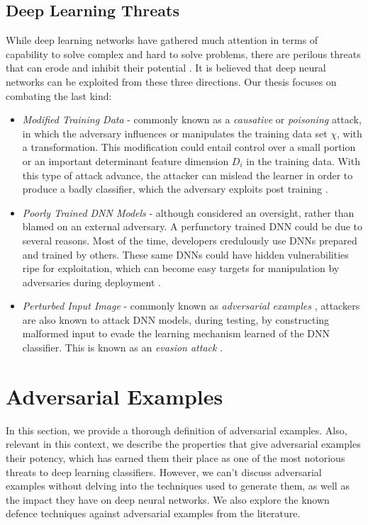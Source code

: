 \documentclass[grad,lot,lof,11pt,oneside,onehalfspace]{RUthesis}
\begin{document}
\subsection{Deep Learning Threats}
While deep learning networks have gathered much attention in terms of capability to solve complex and hard to solve problems, there are perilous threats that can erode and inhibit their potential \cite{xiao_security_2017}. It is believed that deep neural networks can be exploited from these three directions. Our thesis focuses on combating the last kind:
\begin{itemize}
	\item \textit{Modified Training Data} - commonly known as a \textit{causative} or \textit{poisoning} attack, in which the adversary influences or manipulates the training data set \textit{$\chi$}, with a transformation. This modification could entail control over a small portion or an important determinant feature dimension $D_{i}$ in the training data. With this type of attack advance, the attacker can mislead the learner in order to produce a badly classifier, which the adversary exploits post training \cite{huang_adversarial_2011}. 
	\item \textit{Poorly Trained DNN Models} - although considered an oversight, rather than blamed on an external adversary. A perfunctory trained DNN could be due to several reasons. Most of the time, developers 
	credulously use DNNs prepared and trained by others. These same DNNs could have hidden vulnerabilities ripe for exploitation, which can become easy targets for manipulation by adversaries during deployment \cite{xiao_security_2017}.   
	\item \textit{Perturbed Input Image} - commonly known as \textit{adversarial examples} \cite{kurakin_adversarial_2017}, attackers are also known to attack DNN models, during testing, by constructing malformed input to evade the learning mechanism learned of the DNN classifier. This is known as an \textit{evasion attack} \cite{huang_adversarial_2011}.   
\end{itemize}
\section{Adversarial Examples}
In this section, we provide a thorough definition of adversarial examples. Also, relevant in this context, we describe the properties that give adversarial examples their potency, which has earned them their place as one of the most notorious threats to deep learning classifiers. However, we can't discuss adversarial examples without delving into the techniques used to generate them, as well as the impact they have on deep neural networks. We also explore the known defence techniques against adversarial examples from the literature. 
\end{document}
